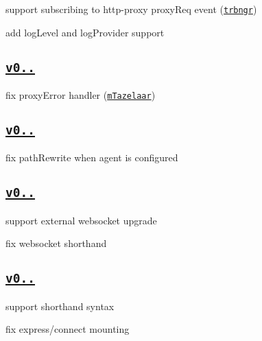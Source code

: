 \begin{DoxyItemize}
\item support subscribing to http-\/proxy {\ttfamily proxy\+Req} event (\href{https://github.com/trbngr}{\tt trbngr})
\item add {\ttfamily log\+Level} and {\ttfamily log\+Provider} support
\end{DoxyItemize}

\subsection*{\href{https://github.com/chimurai/http-proxy-middleware/releases/tag/v0.8.2}{\tt v0..}}


\begin{DoxyItemize}
\item fix proxy\+Error handler (\href{https://github.com/mTazelaar}{\tt m\+Tazelaar})
\end{DoxyItemize}

\subsection*{\href{https://github.com/chimurai/http-proxy-middleware/releases/tag/v0.8.1}{\tt v0..}}


\begin{DoxyItemize}
\item fix path\+Rewrite when {\ttfamily agent} is configured
\end{DoxyItemize}

\subsection*{\href{https://github.com/chimurai/http-proxy-middleware/releases/tag/v0.8.0}{\tt v0..}}


\begin{DoxyItemize}
\item support external websocket upgrade
\item fix websocket shorthand
\end{DoxyItemize}

\subsection*{\href{https://github.com/chimurai/http-proxy-middleware/releases/tag/v0.7.0}{\tt v0..}}


\begin{DoxyItemize}
\item support shorthand syntax
\item fix express/connect mounting
\end{DoxyItemize}

